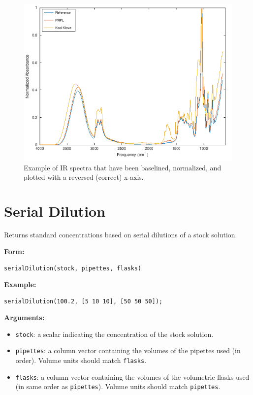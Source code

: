 \documentclass[]{tufte-book}
\begin{document}
\begin{figure}
\centering
\includegraphics{./images/ir-spectrum-example.png}
\caption{Example of IR spectra that have been baselined, normalized, and plotted with a reversed (correct) x-axis.}
\end{figure}

\hypertarget{serial-dilution}{%
\section*{Serial Dilution}\label{serial-dilution}}

Returns standard concentrations based on serial dilutions of a stock solution.

\textbf{Form:}

\texttt{serialDilution(stock,\ pipettes,\ flasks)}

\textbf{Example:}

\texttt{serialDilution(100.2,\ {[}5\ 10\ 10{]},\ {[}50\ 50\ 50{]});}

\textbf{Arguments:}

\begin{itemize}
\item
  \texttt{stock}: a scalar indicating the concentration of the stock solution.
\item
  \texttt{pipettes}: a column vector containing the volumes of the pipettes used (in order). Volume units should match \texttt{flasks}.
\item
  \texttt{flasks}: a column vector containing the volumes of the volumetric flasks used (in same order as \texttt{pipettes}). Volume units should match \texttt{pipettes}.
\end{itemize}
\end{document}
